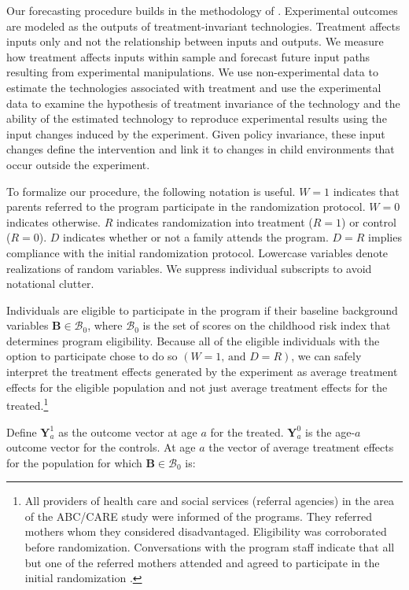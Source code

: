 \noindent Our forecasting procedure builds in the methodology of \cite{Heckman_etal_2013_Matching}. Experimental outcomes are modeled as the outputs of treatment-invariant technologies. Treatment affects inputs only and not the relationship between inputs and outputs. We measure how treatment affects inputs within sample and forecast future input paths resulting from experimental manipulations. We use non-experimental data to estimate the technologies associated with treatment and use the experimental data to examine the hypothesis of treatment invariance of the technology and the ability of the estimated technology to reproduce experimental results using the input changes induced by the experiment. Given policy invariance, these input changes define the intervention and link it to changes in child environments that occur outside the experiment.

To formalize our procedure, the following notation is useful. $W=1$ indicates that parents referred to the program participate in the randomization protocol. $W=0$ indicates otherwise. $R$ indicates randomization into treatment ($R = 1$) or control ($R = 0$). $D$ indicates whether or not a family attends the program. $D= R$ implies compliance with the initial randomization protocol. Lowercase variables denote realizations of random variables. We suppress individual subscripts to avoid notational clutter.

Individuals are eligible to participate in the program if their baseline background variables $\bm{B}\in\mathcal{B}_0$, where $\mathcal{B}_0$ is the set of scores on the childhood risk index that determines program eligibility. Because all of the eligible individuals with the option to participate chose to do so $(W=1\text{, and } D=R)$, we can safely interpret the treatment effects generated by the experiment as average treatment effects for the eligible population and not just average treatment effects for the treated.\footnote{All providers of health care and social services (referral agencies) in the area of the ABC/CARE study were informed of the programs. They referred mothers whom they considered disadvantaged. Eligibility was corroborated before randomization. Conversations with the program staff indicate that all but one of the referred mothers attended and agreed to participate in the initial randomization \citep{Ramey-etal_2012-ABC}.}

Define $\bm{Y}^1_a$ as the outcome vector at age $a$ for the treated. $\bm{Y}^0_a$ is the age-$a$ outcome vector for the controls. At age $a$ the vector of average treatment effects for the population for which $\bm{B}\in\mathcal{B}_0$ is:

